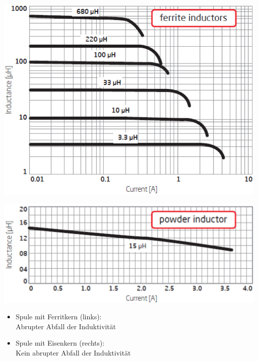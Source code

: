 \begin{minipage}[c]{0.48\columnwidth}
    \includegraphics[width=\columnwidth]{images/induktivitaet_strom.jpg}
\end{minipage}
\hfill
\begin{minipage}[c]{0.48\columnwidth}
    \includegraphics[width=\columnwidth]{images/induktivitaet_strom_power_inductor.jpg}

    \begin{itemize}
        \item Spule mit Ferritkern (links): \\
            Abrupter Abfall der Induktivität
        \item Spule mit Eisenkern (rechts): \\
            Kein abrupter Abfall der Induktivität
    \end{itemize}
\end{minipage}

